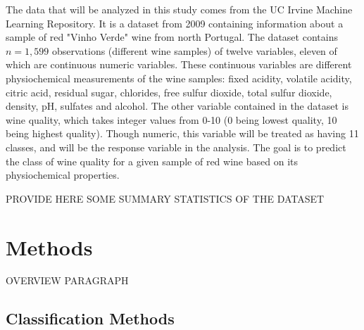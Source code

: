 \documentclass[12pt]{article}
\begin{document}
The data that will be analyzed in this study comes from the UC Irvine 
Machine Learning Repository.  It is a dataset from 2009 containing 
information about a sample of red "Vinho Verde" wine from north Portugal.  
The dataset contains $n=1,599$ observations (different wine samples) of 
twelve variables, eleven of which are continuous numeric variables.  
These continuous variables are different physiochemical measurements of 
the wine samples: fixed acidity, volatile acidity, citric acid, residual 
sugar, chlorides, free sulfur dioxide, total sulfur dioxide, density, 
pH, sulfates and alcohol.  The other variable contained in the dataset 
is wine quality, which takes integer values from 0-10 (0 being lowest 
quality, 10 being highest quality).  Though numeric, this variable will 
be treated as having 11 classes, and will be the response variable in 
the analysis.  The goal is to predict the class of wine quality for a 
given sample of red wine based on its physiochemical properties.  

PROVIDE HERE SOME SUMMARY STATISTICS OF THE DATASET


\section{Methods}
\label{sec:meth}

OVERVIEW PARAGRAPH

\subsection{Classification Methods}
\label{sec:class}
\end{document}
